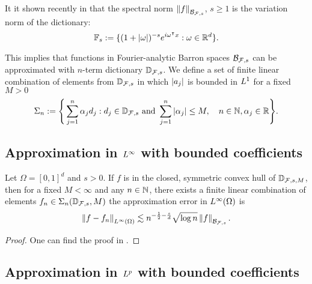 It it shown recently in \cite{siegelSharpBoundsApproximation2022} that the
spectral norm $\left\| f \right\|_{\mathcal{B}_{\mathcal{F}, s}}$, $s \geq 1$ is the variation
norm of the dictionary:
\begin{equation}
    \mathbb{F}_{s} := \{
        (1 + \left| \omega \right|)^{-s} e^{i\omega{}^{\intercal} x}: \omega \in \mathbb{R}^d
    \}.
\end{equation}

This implies that functions in Fourier-analytic Barron spaces $\mathcal{B}_{\mathcal{F},
s}$ can be approximated with $n$-term dictionary $\mathbb{D}_{\mathcal{F}, s}$. We
define a set of finite linear combination of elements from
$\mathbb{D}_{\mathcal{F},s}$ in which $\left| a_j \right|$ is bounded in $L^{1}$ for a
fixed $M > 0$
\begin{equation}
    \Sigma_n := \Bigg\{
        \sum_{j=1}^n \alpha_j d_j: 
        d_j \in \mathbb{D}_{\mathcal{F}, s} \textnormal{ and } 
        \sum_{j=1}^n \left| \alpha_j \right| \leq M, \quad 
        n \in \mathbb{N}, \alpha_j \in \mathbb{R}
    \Bigg\}.
\end{equation}


\subsection{Approximation in $L^{\infty}$ with bounded coefficients}

\begin{theorem}
    Let $\Omega = [0,1]^d$ and $s > 0$. If $f$ is in the closed, symmetric
    convex hull of $\mathbb{D}_{\mathcal{F}, s, M}$, then for a fixed $M<\infty$
    and any $n \in \mathbb{N}$, there exists a finite linear combination of elements
    $f_n \in \Sigma_n(\mathbb{D}_{\mathcal{F}, s}, M)$ the approximation error in
    $L^{\infty}(\Omega)$ is
    \begin{equation}
        \left\| f-f_n \right\|_{L^{\infty}(\Omega)} \lesssim 
        n^{-\frac{1}{2}-\frac{s}{d}} \sqrt{\log{n}} \left\| f \right\|_{\mathcal{B}_{\mathcal{F},s}}.
    \end{equation}

\end{theorem}

\begin{proof}
    One can find the proof in
    \cite{klusowskiApproximationCombinationsReLU2018,siegelSharpBoundsApproximation2022}.
\end{proof}

\subsection{Approximation in $L^{p}$ with bounded coefficients}

